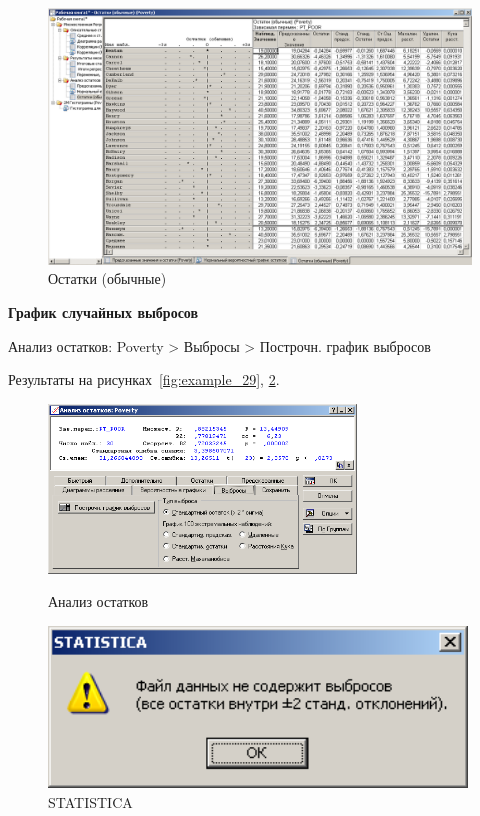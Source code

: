 \begin{figure}[!h]
  \centering

  \includegraphics[width=17cm]
  {inc/example_28.PNG}

  \caption{Остатки (обычные)}

  \label{fig:example_28}
\end{figure}

\newpage

\textbf{График случайных выбросов}

Анализ остатков: Poverty > Выбросы > Построчн. график выбросов

Результаты на рисунках~\ref{fig:example_29}, \ref{fig:example_30}.

\begin{figure}[!h]
  \centering
  \begin{minipage}{0.49\textwidth}
    \centering

    \includegraphics[height=4.5cm]
    {inc/example_29.PNG}

    \caption{Анализ остатков}
    \label{fig:example_29}
  \end{minipage}
  \begin{minipage}{0.49\textwidth}
    \centering

    \includegraphics[width=0.99\textwidth]
    {inc/example_30.PNG}

    \caption{STATISTICA}
    \label{fig:example_30}
  \end{minipage}
\end{figure}

